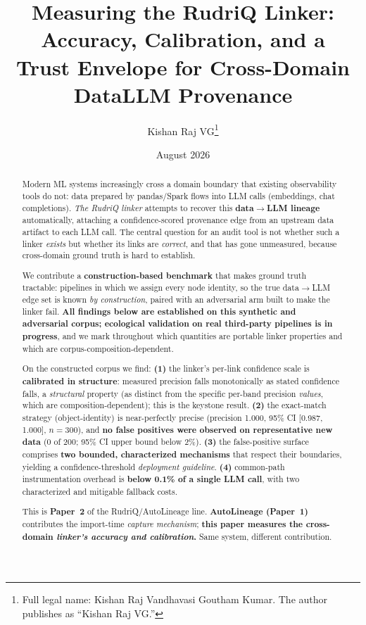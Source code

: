 \documentclass[11pt]{article}
\title{Measuring the RudriQ Linker: Accuracy, Calibration, and a\\
Trust Envelope for Cross-Domain Data\dto{}LLM Provenance}
\author{Kishan Raj VG\thanks{Full legal name: Kishan Raj Vandhavasi Goutham Kumar.
The author publishes as ``Kishan Raj VG.''}}
\affil{University of the Cumberlands, PhD Program, Graduate Information Technology,
Williamsburg, Kentucky, USA\\ \texttt{kishanraj41@gmail.com}}
\date{August 2026}
\newcommand{\dto}{\ensuremath{\rightarrow}}     %
\begin{document}
\maketitle

\begin{abstract}
Modern ML systems increasingly cross a domain boundary that existing observability tools do not: data
prepared by pandas/Spark flows into LLM calls (embeddings, chat completions). \emph{The RudriQ linker}
attempts to recover this \textbf{data\dto{}LLM lineage} automatically, attaching a confidence-scored
provenance edge from an upstream data artifact to each LLM call. The central question for an audit tool is
not whether such a linker \emph{exists} but whether its links are \emph{correct}, and that has gone
unmeasured, because cross-domain ground truth is hard to establish.

We contribute a \textbf{construction-based benchmark} that makes ground truth tractable: pipelines in which
we assign every node identity, so the true data\dto{}LLM edge set is known \emph{by construction}, paired
with an adversarial arm built to make the linker fail. \textbf{All findings below are established on this
synthetic and adversarial corpus; ecological validation on real third-party pipelines is in progress}, and
we mark throughout which quantities are portable linker properties and which are corpus-composition-dependent.

On the constructed corpus we find: \textbf{(1)} the linker's per-link confidence scale is \textbf{calibrated
in structure}: measured precision falls monotonically as stated confidence falls, a \emph{structural}
property (as distinct from the specific per-band precision \emph{values}, which are composition-dependent);
this is the keystone result. \textbf{(2)} the exact-match strategy (object-identity) is near-perfectly
precise (precision 1.000, 95\% CI [0.987, 1.000], $n=300$), and \textbf{no false positives were observed on
representative new data} (0 of 200; 95\% CI upper bound below 2\%). \textbf{(3)} the false-positive surface
comprises \textbf{two bounded, characterized mechanisms} that respect their boundaries, yielding a
confidence-threshold \emph{deployment guideline}. \textbf{(4)} common-path instrumentation overhead is
\textbf{below 0.1\% of a single LLM call}, with two characterized and mitigable fallback costs.

This is \textbf{Paper~2} of the RudriQ/AutoLineage line. \textbf{AutoLineage (Paper~1)}~\cite{vg2026autolineage}
contributes the import-time \emph{capture mechanism}; \textbf{this paper measures the cross-domain
\emph{linker's accuracy and calibration}.} Same system, different contribution.
\end{abstract}
\end{document}
